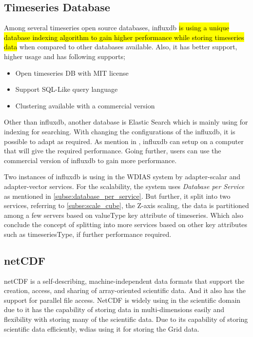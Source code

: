 \subsection{Timeseries Database}
\label{subse:influxdb}
Among several timeseries open source databases, \acrshort{influxdb} \cite{influxdbInfluxDBDocumentation} \hl{is using a unique database indexing algorithm to gain higher performance while storing timeseries data} when compared to other databases available. Also, it has better support, higher usage and has following supports;
\begin{itemize}
  \item Open timeseries DB with MIT license
  \item Support SQL-Like query language
  \item Clustering available with a commercial version
\end{itemize}
Other than \acrshort{influxdb}, another database is Elastic Search which is mainly using for indexing for searching.
With changing the configurations of the \acrshort{influxdb}, it is possible to adapt as required. As mention in \cite{influxdbInfluxDBDocumentation}, 
\acrshort{influxdb} can setup on a computer that will give the required performance. Going further, users can use the commercial version of \acrshort{influxdb} to gain more performance.

Two instances of \acrshort{influxdb} is using in the WDIAS system by adapter-scalar and adapter-vector services. For the scalability, the system uses \emph{Database per Service} as mentioned in \cref{subse:database_per_service}.
But further, it split into two services, referring to \cref{subse:scale_cube}, the Z-axis scaling, the data is partitioned among a few servers based on valueType key attribute of timeseries.
Which also conclude the concept of splitting into more services based on other key attributes such as timeseriesType, if further performance required.

\subsection{\acrfull{netCDF}}
\label{subse:netcdf}
\acrshort{netCDF} \cite{unidataUnidataNetCDF} is a self-describing, machine-independent data formats that support the creation, access, and sharing of array-oriented scientific data.
And it also has the support for parallel file access.
NetCDF is widely using in the scientific domain due to it has the capability of storing data in multi-dimensions easily and flexibility with storing many of the scientific data. Due to its capability of storing scientific data efficiently, \acrshort{wdias} using it for storing the Grid data.

